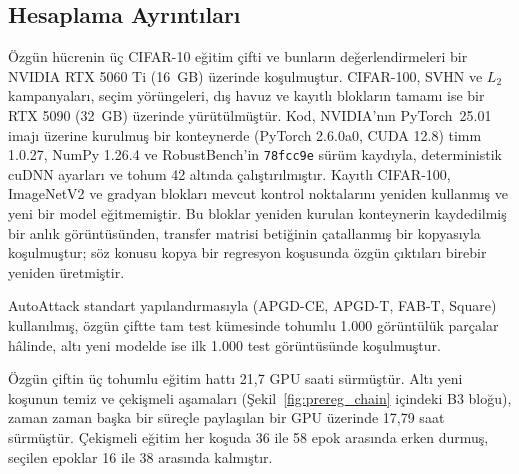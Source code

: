 \subsection{Hesaplama Ayrıntıları}
\label{subsec:computational}

Özgün hücrenin üç CIFAR-10 eğitim çifti ve bunların değerlendirmeleri bir NVIDIA RTX 5060 Ti (16~GB) üzerinde koşulmuştur. CIFAR-100, SVHN ve $L_2$ kampanyaları, seçim yörüngeleri, dış havuz ve kayıtlı blokların tamamı ise bir RTX 5090 (32~GB) üzerinde yürütülmüştür. Kod, NVIDIA'nın PyTorch~25.01 imajı üzerine kurulmuş bir konteynerde (PyTorch 2.6.0a0, CUDA 12.8) timm 1.0.27, NumPy 1.26.4 ve RobustBench'in \texttt{78fcc9e} sürüm kaydıyla, deterministik cuDNN ayarları ve tohum 42 altında çalıştırılmıştır. Kayıtlı CIFAR-100, ImageNetV2 ve gradyan blokları mevcut kontrol noktalarını yeniden kullanmış ve yeni bir model eğitmemiştir. Bu bloklar yeniden kurulan konteynerin kaydedilmiş bir anlık görüntüsünden, transfer matrisi betiğinin çatallanmış bir kopyasıyla koşulmuştur; söz konusu kopya bir regresyon koşusunda özgün çıktıları birebir yeniden üretmiştir.

AutoAttack standart yapılandırmasıyla (APGD-CE, APGD-T, FAB-T, Square) kullanılmış, özgün çiftte tam test kümesinde tohumlu 1.000 görüntülük parçalar hâlinde, altı yeni modelde ise ilk 1.000 test görüntüsünde koşulmuştur.

Özgün çiftin üç tohumlu eğitim hattı 21{,}7 GPU saati sürmüştür. Altı yeni koşunun temiz ve çekişmeli aşamaları (Şekil~\ref{fig:prereg_chain} içindeki B3 bloğu), zaman zaman başka bir süreçle paylaşılan bir GPU üzerinde 17{,}79 saat sürmüştür. Çekişmeli eğitim her koşuda 36 ile 58 epok arasında erken durmuş, seçilen epoklar 16 ile 38 arasında kalmıştır.
